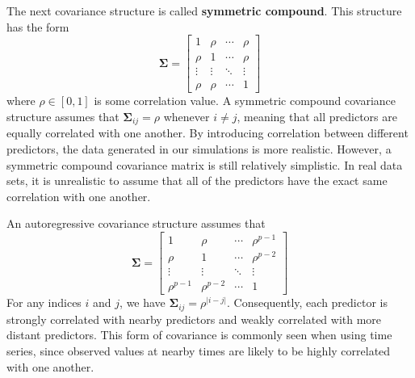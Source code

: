 \documentclass{article}
\begin{document}
The next covariance structure is called \textbf{symmetric compound}. This structure has the form
\begin{equation}\label{eqn:symmetric-compound-matrix}
	\mathbf{\Sigma} = \begin{bmatrix}
		1 & \rho & \cdots & \rho \\
		\rho & 1 & \cdots & \rho \\
		\vdots & \vdots & \ddots & \vdots \\
		\rho & \rho & \cdots & 1
	\end{bmatrix}
\end{equation}
where $\rho \in [0, 1]$ is some correlation value. A symmetric compound covariance structure assumes that $\mathbf{\Sigma}_{ij} = \rho$ whenever $i \neq j$, meaning that all predictors are equally correlated with one another. By introducing correlation between different predictors, the data generated in our simulations is more realistic. However, a symmetric compound covariance matrix is still relatively simplistic. In real data sets, it is unrealistic to assume that all of the predictors have the exact same correlation with one another.

An autoregressive covariance structure assumes that
\begin{equation}
	\mathbf{\Sigma} = \begin{bmatrix}
		1 & \rho & \cdots & \rho^{p - 1} \\
		\rho & 1 & \cdots & \rho^{p - 2} \\
		\vdots & \vdots & \ddots & \vdots \\
		\rho^{p - 1} & \rho^{p - 2} & \cdots & 1
	\end{bmatrix}
\end{equation}
For any indices $i$ and $j$, we have $\mathbf{\Sigma}_{ij} = \rho^{\vert i - j\vert}$. Consequently, each predictor is strongly correlated with nearby predictors and weakly correlated with more distant predictors. This form of covariance is commonly seen when using time series, since observed values at nearby times are likely to be highly correlated with one another. 
\end{document}
